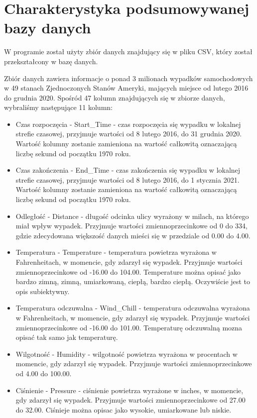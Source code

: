 \documentclass{classrep}
\begin{document}
\section{Charakterystyka podsumowywanej bazy danych}
W programie został użyty zbiór danych \cite{dane} znajdujący się w pliku CSV, który został przekształcony w bazę danych.

Zbiór danych zawiera informacje o ponad 3 milionach wypadków samochodowych w 49 stanach Zjednoczonych Stanów Ameryki, mających miejsce od lutego 2016 do grudnia 2020. Spośród 47 kolumn znajdujących się w zbiorze danych, wybraliśmy następujące 11 kolumn:
\begin{itemize}
\item Czas rozpoczęcia - Start\_Time - czas rozpoczęcia się wypadku w lokalnej strefie czasowej, przyjmuje wartości od 8 lutego 2016, do 31 grudnia 2020. Wartość kolumny zostanie zamieniona na wartość całkowitą oznaczającą liczbę sekund od początku 1970 roku.
\item Czas zakończenia - End\_Time - czas zakończenia się wypadku w lokalnej strefie czasowej, przyjmuje wartości od 8 lutego 2016, do 1 stycznia 2021. Wartość kolumny zostanie zamieniona na wartość całkowitą oznaczającą liczbę sekund od początku 1970 roku.
\item Odległość - Distance - długość odcinka ulicy wyrażony w milach, na którego miał wpływ wypadek. Przyjmuje wartości zmiennoprzecinkowe od 0 do 334, gdzie zdecydowana większość danych mieści się w przedziale od 0.00 do 4.00.
\item Temperatura - Temperature - temperatura powietrza wyrażona w Fahrenheitach, w momencie, gdy zdarzył się wypadek. Przyjmuje wartości zmiennoprzecinkowe od -16.00 do 104.00. Temperature można opisać jako bardzo zimną, zimną, umiarkowaną, ciepłą, bardzo ciepłą. Oczywiście jest to opis subiektywny.
\item Temperatura odczuwalna - Wind\_Chill - temperatura odczuwalna wyrażona w Fahrenheitach, w momencie, gdy zdarzył się wypadek. Przyjmuje wartości zmiennoprzecinkowe od -16.00 do 101.00. Temperaturę odczuwalną mozna opisać tak samo jak temperaturę.
\item Wilgotność - Humidity - wilgotność powietrza wyrażona w procentach w momencie, gdy zdarzył się wypadek. Przyjmuje wartości zmiennoprzecinkowe od 4.00 do 100.00.
\item Ciśnienie - Pressure - ciśnienie powietrza wyrażone w inches, w momencie, gdy zdarzył się wypadek. Przyjmuje wartości zmiennoprzecinkowe od 27.00 do 32.00. Ciśnieje można opisac jako wysokie, umiarkowane lub niskie.

\end{itemize}
\end{document}
